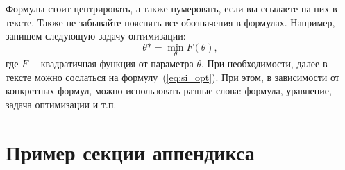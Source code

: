 Формулы стоит центрировать, а также нумеровать, если вы ссылаете на них в тексте. Также не забывайте пояснять все обозначения в формулах. Например, запишем следующую задачу оптимизации:
\begin{equation}
    \label{eq:si_opt}
        \theta* = \min_{\theta} F(\theta),
\end{equation}
где $F$~-- квадратичная функция от параметра $\theta$. При необходимости, далее в тексте можно сослаться на формулу~(\ref{eq:si_opt}). При этом, в зависимости от конкретных формул, можно использовать разные слова: формула, уравнение, задача оптимизации и т.п.


	
\newpage 
\printbibliography[heading=bibintoc] 

	
\newpage
\appendix

\section{Пример секции аппендикса}


